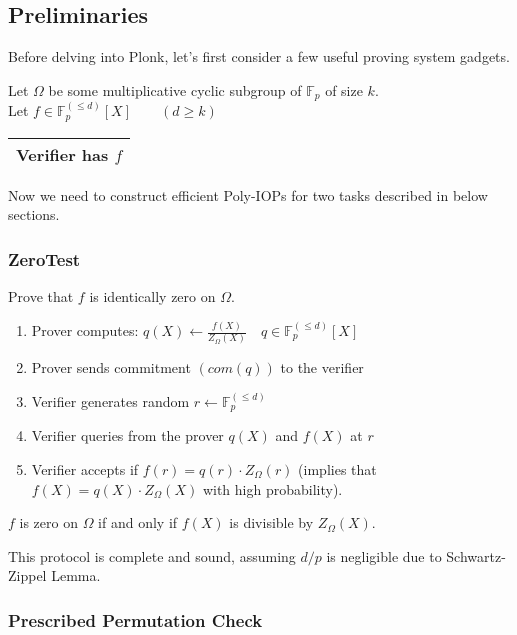 \documentclass[../lecture-notes.tex]{subfiles}
\begin{document}
\subsection{Preliminaries}

Before delving into Plonk, let's first consider a few useful proving system gadgets.

Let $\Omega$ be some multiplicative cyclic subgroup of $\mathbb{F}_p$ of size $k$. \\
Let $f \in \mathbb{F}_p^{(\leq d)}[X] \qquad (d \geq k)$ \hfill \begin{tabular}{|c|}\hline Verifier has $f$ \\ \hline \end{tabular} 

Now we need to construct efficient Poly-IOPs for two tasks described in below sections.

\subsubsection{ZeroTest}

Prove that $f$ is identically zero on $\Omega$.

\begin{enumerate}
    \item Prover computes: \( q(X) \leftarrow \frac{f(X)}{Z_{\Omega}(X)} \quad q \in \mathbb{F}_p^{(\leq d)}[X] \)
    \item Prover sends commitment \(\left( com(q) \right)\) to the verifier
    \item Verifier generates random \(r \leftarrow\mathbb{F}_p^{(\leq d)} \)
    \item Verifier queries from the prover \(q(X)\) and \(f(X)\) at \(r\)
    \item Verifier accepts if $f(r) = q(r) \cdot Z_{\Omega}(r)$ (implies that $f(X) = q(X) \cdot Z_{\Omega}(X)$ with high probability).
\end{enumerate}

\begin{lemma}
    $f$ is zero on $\Omega$ if and only if $f(X)$ is divisible by $Z_{\Omega}(X)$.
\end{lemma}

\begin{remark}
This protocol is complete and sound, assuming $d/p$ is negligible due to Schwartz-Zippel Lemma.
\end{remark}

\subsubsection{Prescribed Permutation Check}
\end{document}
